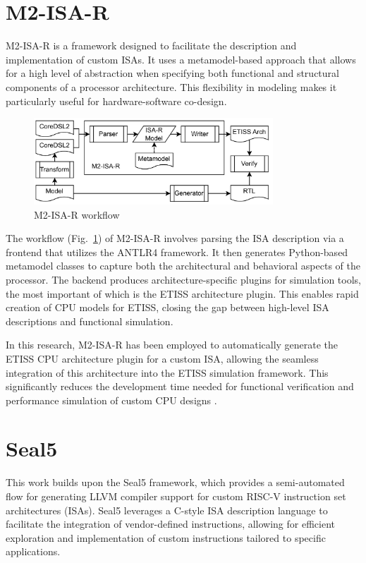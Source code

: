 \section{M2-ISA-R}
M2-ISA-R is a framework designed to facilitate the description and implementation of custom ISAs. It uses a metamodel-based approach that allows for a high level of abstraction when specifying both functional and structural components of a processor architecture. This flexibility in modeling makes it particularly useful for hardware-software co-design.

\begin{figure}
    \centering
    \includegraphics[width=0.8\textwidth]{figures/m2isar.png}
    \caption{M2-ISA-R workflow \cite{RISCVSimulation}}
    \label{fig:m2isar}
\end{figure}

The workflow (Fig.~\ref{fig:m2isar}) of M2-ISA-R involves parsing the ISA description via a frontend that utilizes the ANTLR4 framework. It then generates Python-based metamodel classes to capture both the architectural and behavioral aspects of the processor. The backend produces architecture-specific plugins for simulation tools, the most important of which is the ETISS architecture plugin. This enables rapid creation of CPU models for ETISS, closing the gap between high-level ISA descriptions and functional simulation.

In this research, M2-ISA-R has been employed to automatically generate the ETISS CPU architecture plugin for a custom ISA, allowing the seamless integration of this architecture into the ETISS simulation framework. This significantly reduces the development time needed for functional verification and performance simulation of custom CPU designs \cite{RISCVSimulation}.

\section{Seal5}

This work builds upon the Seal5 framework, which provides a semi-automated flow for generating LLVM compiler support for custom RISC-V instruction set architectures (ISAs). Seal5 leverages a C-style ISA description language to facilitate the integration of vendor-defined instructions, allowing for efficient exploration and implementation of custom instructions tailored to specific applications.

